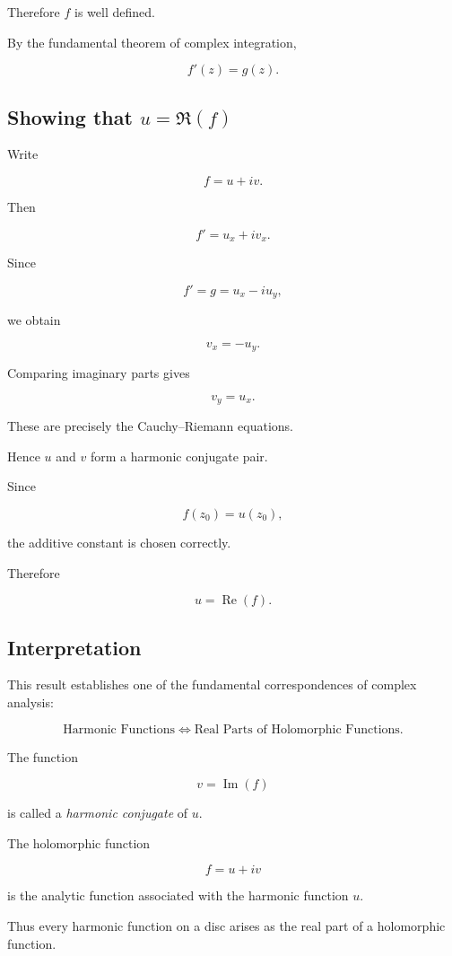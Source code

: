 \documentclass[12pt,a4paper]{article}
\theoremstyle{notespace}
\begin{document}
Therefore \(f\) is well defined.

By the fundamental theorem of complex integration,

\[
\boxed{
	f'(z)=g(z).
}
\]

\subsection*{Showing that \(u=\Re(f)\)}

Write

\[
f=u+iv.
\]

Then

\[
f'
=
u_x+i v_x.
\]

Since

\[
f'
=
g
=
u_x-i u_y,
\]

we obtain

\[
v_x=-u_y.
\]

Comparing imaginary parts gives

\[
v_y=u_x.
\]

These are precisely the Cauchy--Riemann equations.

Hence \(u\) and \(v\) form a harmonic conjugate pair.

Since

\[
f(z_0)=u(z_0),
\]

the additive constant is chosen correctly.

Therefore

\[
\boxed{
	u=\operatorname{Re}(f).
}
\]

\subsection*{Interpretation}

This result establishes one of the fundamental correspondences of complex analysis:

\[
\boxed{
	\text{Harmonic Functions}
	\Longleftrightarrow
	\text{Real Parts of Holomorphic Functions}.
}
\]

The function

\[
v=\operatorname{Im}(f)
\]

is called a \emph{harmonic conjugate} of \(u\).

The holomorphic function

\[
f=u+iv
\]

is the analytic function associated with the harmonic function \(u\).

Thus every harmonic function on a disc arises as the real part of a holomorphic function.
	
\end{document}
